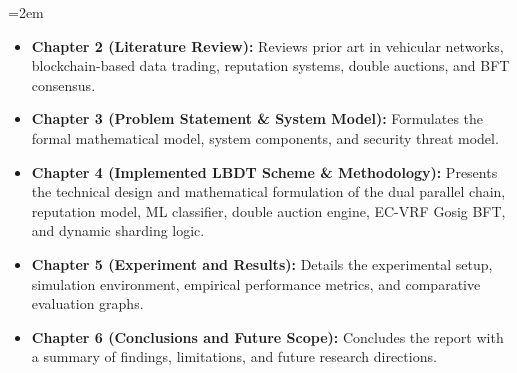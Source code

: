 {\emergencystretch=2em
\begin{itemize}
    \item \textbf{Chapter 2 (Literature Review):} Reviews prior art in vehicular networks, blockchain-based data trading, reputation systems, double auctions, and BFT consensus.

    \item \textbf{Chapter 3 (Problem Statement \& System Model):} Formulates the formal mathematical model, system components, and security threat model.

    \item \textbf{Chapter 4 (Implemented LBDT Scheme \& Methodology):} Presents the technical design and mathematical formulation of the dual parallel chain, reputation model, ML classifier, double auction engine, EC-VRF Gosig BFT, and dynamic sharding logic.

    \item \textbf{Chapter 5 (Experiment and Results):} Details the experimental setup, simulation environment, empirical performance metrics, and comparative evaluation graphs.

    \item \textbf{Chapter 6 (Conclusions and Future Scope):} Concludes the report with a summary of findings, limitations, and future research directions.
\end{itemize}
}
